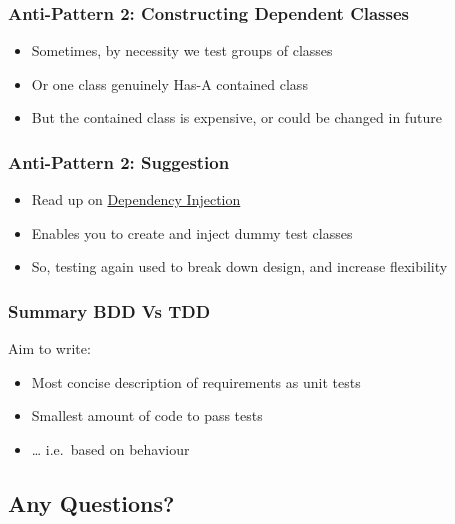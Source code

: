 \hypertarget{anti-pattern-2-constructing-dependent-classes}{%
\subsubsection{Anti-Pattern 2: Constructing Dependent
Classes}\label{anti-pattern-2-constructing-dependent-classes}}

\begin{itemize}
\tightlist
\item
  Sometimes, by necessity we test groups of classes
\item
  Or one class genuinely Has-A contained class
\item
  But the contained class is expensive, or could be changed in future
\end{itemize}

\hypertarget{anti-pattern-2-suggestion}{%
\subsubsection{Anti-Pattern 2:
Suggestion}\label{anti-pattern-2-suggestion}}

\begin{itemize}
\tightlist
\item
  Read up on
  \href{https://martinfowler.com/articles/injection.html}{Dependency
  Injection}
\item
  Enables you to create and inject dummy test classes
\item
  So, testing again used to break down design, and increase flexibility
\end{itemize}

\hypertarget{summary-bdd-vs-tdd}{%
\subsubsection{Summary BDD Vs TDD}\label{summary-bdd-vs-tdd}}

Aim to write:

\begin{itemize}
\tightlist
\item
  Most concise description of requirements as unit tests
\item
  Smallest amount of code to pass tests
\item
  \ldots{} i.e.~based on behaviour
\end{itemize}

\hypertarget{any-questions}{%
\subsection{Any Questions?}\label{any-questions}}

